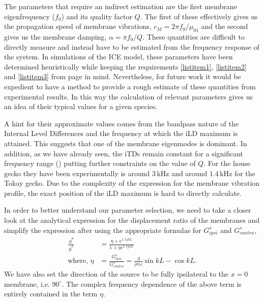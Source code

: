 The parameters that require an indirect estimation are the first membrane eigenfrequency ($f_0$) and
its quality factor $Q$. The first of these effectively gives us the propagation speed of membrane vibrations, $c_M=2\pi f_0/\mu_{01}$ 
and the second gives us the membrane damping, $\alpha=\pi f_0/Q$. These quantities are difficult to directly measure and instead
have to be estimated from the frequency response of the system. In simulations of the ICE model, these parameters have been determined heuristically
while keeping the requirements \ref{listitem1}, \ref{listitem2} and \ref{listitem3} from page \pageref{listitem1} in mind. Nevertheless, for future work
it would be expedient to have a method to provide a rough estimate of these quantities from experimental results. In this way the calculation
of relevant parameters gives us an idea of their typical values for a given species.

A hint for their approximate values comes from the bandpass nature of the Internal Level Differences and the frequency at which the iLD maximum is attained.
This suggests that one of the membrane eigenmodes is dominant. In addition, as we have already seen, the iTDs remain constant for a significant frequency
range (\cite[p~.1996]{dalsgaardtangcarr}) putting further constraints on the value of $Q$. For the house gecko they have been experimentally is around $3\,$kHz and
 around $1.4\,$kHz for the Tokay gecko. Due to the complexity of the expression for the membrane vibration profile, the exact position of the iLD maximum is hard to directly calculate.

In order to better understand our parameter selection, we 
need to take a closer look at the analytical expression for the displacement ratio of the membranes and  simplify the expression after using the appropriate formulas for $G^s_{ipsi}$ and $G^s_{contra}$,
\begin{align}
 \frac{\dot{S}^0}{\dot{S}^L}&=\frac{\eta+e^{1.5jkL}}{1+\eta e^{1.5jkL}}\label{displacementratio}\\
 \mbox{where, }\eta&=\frac{G^s_{ipsi}}{G^s_{contra}}=\frac{\Lambda}{\rho c\omega}\sin kL-\cos kL.\nonumber
\end{align}
We have also set the direction of the source to be fully ipsilateral to the $x=0$ membrane, i.e. $90^\circ$. The complex frequency
dependence of the above term is entirely contained in the term $\eta$.

